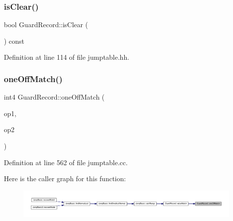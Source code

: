 \subsubsection{\texorpdfstring{isClear()}{isClear()}}
{\footnotesize\ttfamily bool Guard\+Record\+::is\+Clear (\begin{DoxyParamCaption}\item[{void}]{ }\end{DoxyParamCaption}) const\hspace{0.3cm}{\ttfamily [inline]}}



Definition at line 114 of file jumptable.\+hh.

\mbox{\label{class_guard_record_a7bb09d1f9a8bb6ccfa85a6a9de7c38fb}} 
\subsubsection{\texorpdfstring{oneOffMatch()}{oneOffMatch()}}
{\footnotesize\ttfamily int4 Guard\+Record\+::one\+Off\+Match (\begin{DoxyParamCaption}\item[{\mbox{\hyperlink{class_pcode_op}{Pcode\+Op}} $\ast$}]{op1,  }\item[{\mbox{\hyperlink{class_pcode_op}{Pcode\+Op}} $\ast$}]{op2 }\end{DoxyParamCaption})\hspace{0.3cm}{\ttfamily [static]}}



Definition at line 562 of file jumptable.\+cc.

Here is the caller graph for this function\+:
\nopagebreak
\begin{figure}[H]
\begin{center}
\leavevmode
\includegraphics[width=350pt]{class_guard_record_a7bb09d1f9a8bb6ccfa85a6a9de7c38fb_icgraph}
\end{center}
\end{figure}
\mbox{\label{class_guard_record_aae0d383384df8fbee667f88ee76b13f3}} 
